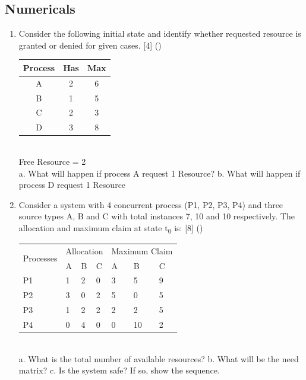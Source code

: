 \documentclass[12pt]{article}
\newcommand{\sub}[1]{\textsubscript{#1}}
\begin{document}
	\subsection{Numericals}
		\begin{enumerate}
			\item Consider the following initial state and identify whether requested resource is granted or denied for given cases. \hfill [4] ()\\
			\begin{tabular}{|c|c|c|}
				\hline
				Process & Has & Max \\ \hline
				A & 2 & 6 \\ \hline
				B & 1 & 5 \\ \hline
				C & 2 & 3 \\ \hline
				D & 3 & 8 \\ \hline
			\end{tabular}\\
			Free Resource = 2\\
			a. What will happen if process A request 1 Resource?
			b. What will happen if process D request 1 Resource

			\item Consider a system with 4 concurrent process (P1, P2, P3, P4) and three source types A, B and C with total instances 7, 10 and 10 respectively. The allocation and maximum claim at state t\sub{0} is: \hfill [8] ()\\
			\begin{tabular}{|p{17mm}|p{7mm}|p{7mm}|p{7mm}|p{7mm}|p{7mm}|p{7mm}|}
				\hline
				\multirow{2}{*}{Processes} & \multicolumn{3}{|c|}{Allocation} & \multicolumn{3}{|c|}{Maximum Claim} \\ \cline{2-7}
				& A & B & C & A & B & C \\ \hline
				P1 & 1 & 2 & 0 & 3 & 5 & 9 \\ \hline
				P2 & 3 & 0 & 2 & 5 & 0 & 5 \\ \hline
				P3 & 1 & 2 & 2 & 2 & 2 & 5 \\ \hline
				P4 & 0 & 4 & 0 & 0 & 10 & 2 \\ \hline
			\end{tabular}\\
			a. What is the total number of available resources?
			b. What will be the need matrix?
			c. Is the system safe? If so, show the sequence.


\end{enumerate}
\end{document}
